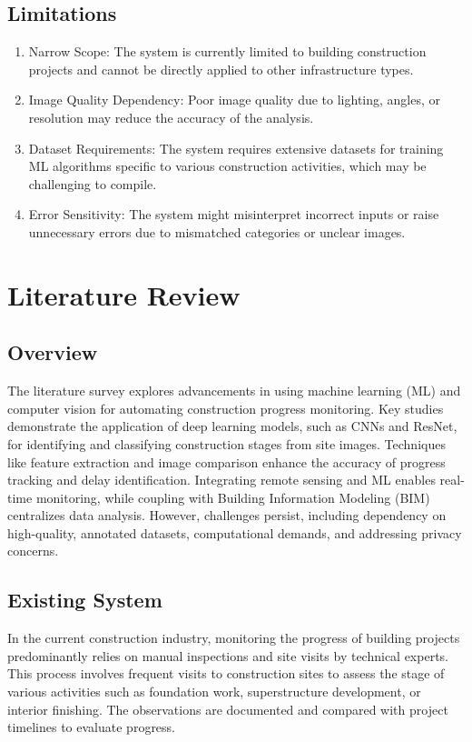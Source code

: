 \section{Limitations}
\label{sec:limitations-unique}
\begin{enumerate}
    \item Narrow Scope: The system is currently limited to building construction projects and cannot be directly applied to other infrastructure types.
    \item Image Quality Dependency: Poor image quality due to lighting, angles, or resolution may reduce the accuracy of the analysis.
    \item Dataset Requirements: The system requires extensive datasets for training ML algorithms specific to various construction activities, which may be challenging to compile.
    \item Error Sensitivity: The system might misinterpret incorrect inputs or raise unnecessary errors due to mismatched categories or unclear images.
\end{enumerate}


\chapter{Literature Review}

\section{Overview}
The literature survey explores advancements in using machine learning (ML) and computer vision for automating construction progress monitoring. Key studies demonstrate the application of deep learning models, such as CNNs and ResNet, for identifying and classifying construction stages from site images. Techniques like feature extraction and image comparison enhance the accuracy of progress tracking and delay identification. Integrating remote sensing and ML enables real-time monitoring, while coupling with Building Information Modeling (BIM) centralizes data analysis. However, challenges persist, including dependency on high-quality, annotated datasets, computational demands, and addressing privacy concerns.

\section{Existing System}
In the current construction industry, monitoring the progress of building projects predominantly relies on manual inspections and site visits by technical experts. This process involves frequent visits to construction sites to assess the stage of various activities such as foundation work, superstructure development, or interior finishing. The observations are documented and compared with project timelines to evaluate progress.

